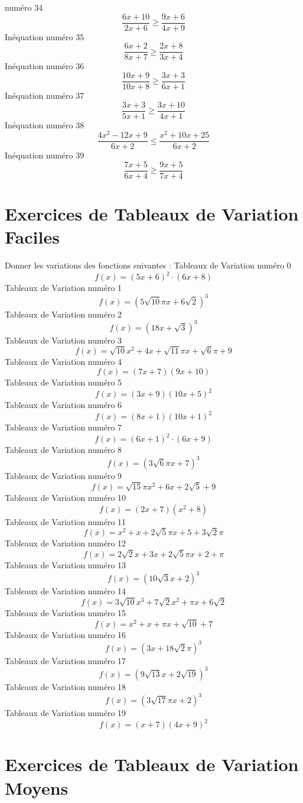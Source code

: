 \documentclass{article}
\begin{document}
num\'ero 34 \[\frac{6 x + 10}{2 x + 6} \geq \frac{9 x + 6}{4 x + 9}\]In\'equation num\'ero 35 \[\frac{6 x + 2}{8 x + 7} \geq \frac{2 x + 8}{3 x + 4}\]In\'equation num\'ero 36 \[\frac{10 x + 9}{10 x + 8} \geq \frac{3 x + 3}{6 x + 1}\]In\'equation num\'ero 37 \[\frac{3 x + 3}{5 x + 1} \geq \frac{3 x + 10}{4 x + 1}\]In\'equation num\'ero 38 \[\frac{4 x^{2} - 12 x + 9}{6 x + 2} \leq \frac{x^{2} + 10 x + 25}{6 x + 2}\]In\'equation num\'ero 39 \[\frac{7 x + 5}{6 x + 4} \geq \frac{9 x + 5}{7 x + 4}\]
 \section{Exercices de Tableaux de Variation Faciles}

 Donner les variations des fonctions suivantes : 
Tableaux de Variation num\'ero 0 \[f(x) = \left(5 x + 6\right)^{2} \cdot \left(6 x + 8\right)\]Tableaux de Variation num\'ero 1 \[f(x) = \left(5 \sqrt{10} \pi x + 6 \sqrt{2}\right)^{3}\]Tableaux de Variation num\'ero 2 \[f(x) = \left(18 x + \sqrt{3}\right)^{3}\]Tableaux de Variation num\'ero 3 \[f(x) = \sqrt{10} x^{2} + 4 x + \sqrt{11} \pi x + \sqrt{6} \pi + 9\]Tableaux de Variation num\'ero 4 \[f(x) = \left(7 x + 7\right) \left(9 x + 10\right)\]Tableaux de Variation num\'ero 5 \[f(x) = \left(3 x + 9\right) \left(10 x + 5\right)^{2}\]Tableaux de Variation num\'ero 6 \[f(x) = \left(8 x + 1\right) \left(10 x + 1\right)^{2}\]Tableaux de Variation num\'ero 7 \[f(x) = \left(6 x + 1\right)^{2} \cdot \left(6 x + 9\right)\]Tableaux de Variation num\'ero 8 \[f(x) = \left(3 \sqrt{6} \pi x + 7\right)^{3}\]Tableaux de Variation num\'ero 9 \[f(x) = \sqrt{15} \pi x^{2} + 6 x + 2 \sqrt{5} + 9\]Tableaux de Variation num\'ero 10 \[f(x) = \left(2 x + 7\right) \left(x^{2} + 8\right)\]Tableaux de Variation num\'ero 11 \[f(x) = x^{2} + x + 2 \sqrt{5} \pi x + 5 + 3 \sqrt{2} \pi\]Tableaux de Variation num\'ero 12 \[f(x) = 2 \sqrt{2} x + 3 x + 2 \sqrt{5} \pi x + 2 + \pi\]Tableaux de Variation num\'ero 13 \[f(x) = \left(10 \sqrt{3} x + 2\right)^{3}\]Tableaux de Variation num\'ero 14 \[f(x) = 3 \sqrt{10} x^{3} + 7 \sqrt{2} x^{2} + \pi x + 6 \sqrt{2}\]Tableaux de Variation num\'ero 15 \[f(x) = x^{2} + x + \pi x + \sqrt{10} + 7\]Tableaux de Variation num\'ero 16 \[f(x) = \left(3 x + 18 \sqrt{2} \pi\right)^{3}\]Tableaux de Variation num\'ero 17 \[f(x) = \left(9 \sqrt{13} x + 2 \sqrt{19}\right)^{3}\]Tableaux de Variation num\'ero 18 \[f(x) = \left(3 \sqrt{17} \pi x + 2\right)^{3}\]Tableaux de Variation num\'ero 19 \[f(x) = \left(x + 7\right) \left(4 x + 9\right)^{2}\]
 \section{Exercices de Tableaux de Variation Moyens}
\end{document}
